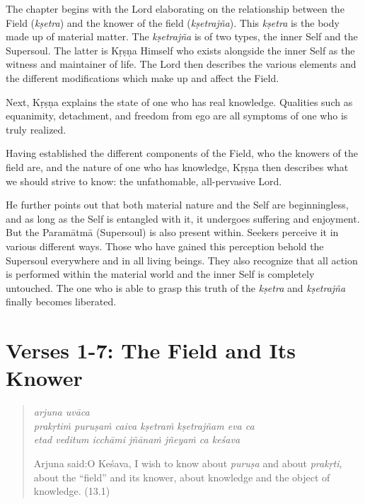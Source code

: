 \documentclass[12pt, twoside, openright]{memoir}
\begin{document}
The chapter begins with the Lord elaborating on the relationship between the Field (\textit{kṣetra}) and the knower of the field (\textit{kṣetrajña}). This \textit{kṣetra} is the body made up of material matter. The \textit{kṣetrajña} is of two types, the inner Self and the Supersoul. The latter is Kṛṣṇa Himself who exists alongside the inner Self as the witness and maintainer of life. The Lord then describes the various elements and the different modifications which make up and affect the Field.

Next, Kṛṣṇa explains the state of one who has real knowledge. Qualities such as equanimity, detachment, and freedom from ego are all symptoms of one who is truly realized.

Having established the different components of the Field, who the knowers of the field are, and the nature of one who has knowledge, Kṛṣṇa then describes what we should strive to know: the unfathomable, all-pervasive Lord.

He further points out that both material nature and the Self are beginningless, and as long as the Self is entangled with it, it undergoes suffering and enjoyment. But the Paramātmā (Supersoul) is also present within. Seekers perceive it in various different ways. Those who have gained this perception behold the Supersoul everywhere and in all living beings. They also recognize that all action is performed within the material world and the inner Self is completely untouched. The one who is able to grasp this truth of the \textit{kṣetra} and \textit{kṣetrajña} finally becomes liberated.

\section{Verses 1-7: The Field and Its Knower}\label{sec-verses-1-7-the-field-and-its-knower}



\par
\begin{verse}
\textit{arjuna uvāca} \\
\textit{prakṛtiṁ puruṣaṁ caiva kṣetraṁ kṣetrajñam eva ca} \\
\textit{etad veditum icchāmi jñānaṁ jñeyaṁ ca keśava}

\noindent \quad Arjuna said:\linebreak O Keśava, I wish to know about \textit{puruṣa} and about \textit{prakṛti}, about the \enquote{field} and its knower, about knowledge and the object of knowledge. (13.1)
\end{verse}
\par
\end{document}
